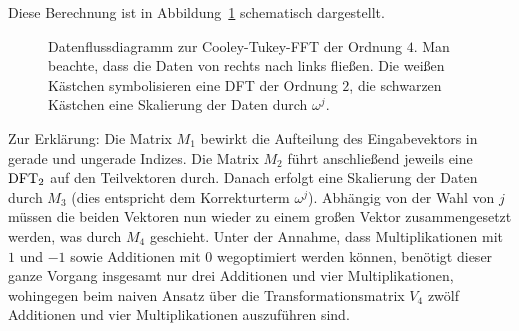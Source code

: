 Diese Berechnung ist in Abbildung~\ref{fig:cooley-tukey-fft} schematisch dargestellt.
\begin{figure}[ht]
\centering
{}
  \caption{Datenflussdiagramm zur Cooley-Tukey-FFT der Ordnung $ 4 $. Man beachte, dass die Daten
  von rechts nach links fließen. Die weißen Kästchen symbolisieren eine DFT der Ordnung $ 2 $,
  die schwarzen Kästchen eine Skalierung der Daten durch $ \omega^{j} $.}
  \label{fig:cooley-tukey-fft}
\end{figure}
Zur Erklärung: Die Matrix $ M_{1} $ bewirkt die Aufteilung des Eingabevektors in gerade und ungerade
Indizes. Die Matrix $ M_{2} $ führt anschließend jeweils eine $ \operatorname{DFT}_{2} $ auf den Teilvektoren 
durch. Danach erfolgt eine Skalierung der Daten durch $ M_{3} $ (dies entspricht dem Korrekturterm
$ \omega^{j} $). Abhängig von der Wahl von $ j $ müssen die beiden Vektoren nun wieder zu einem
großen Vektor zusammengesetzt werden, was durch $ M_{4} $ geschieht. Unter der Annahme, dass 
Multiplikationen mit $ 1 $ und $ -1 $ sowie Additionen mit $ 0 $ wegoptimiert werden können, 
benötigt dieser ganze Vorgang insgesamt nur drei Additionen und vier Multiplikationen, wohingegen 
beim naiven Ansatz über die Transformationsmatrix $ V_{4} $ zwölf Additionen und vier 
Multiplikationen auszuführen sind.

